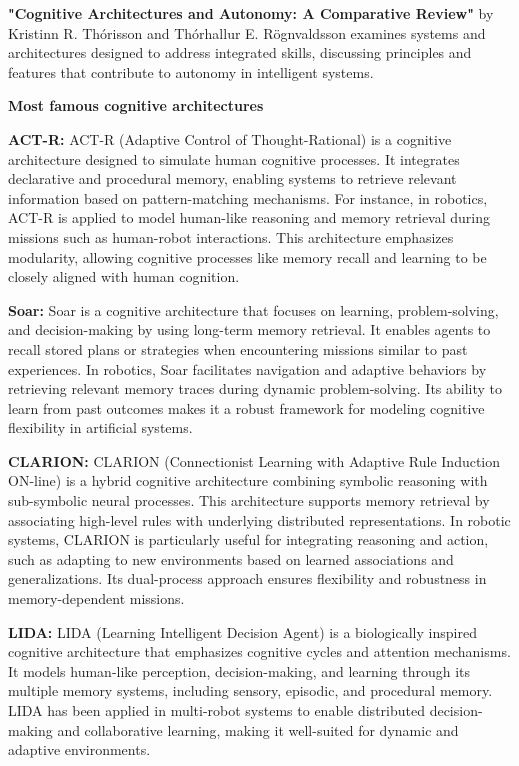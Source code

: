 \documentclass{book}
\providecommand{\ProjectDeepHeading}[2]{%
    \par\medskip\noindent\textbf{#2}\par\smallskip
}
\begin{document}
            \textbf{"Cognitive Architectures and Autonomy: A Comparative Review"} by Kristinn R. Thórisson and Thórhallur E. Rögnvaldsson examines systems and architectures designed to address integrated skills, discussing principles and features that contribute to autonomy in intelligent systems. 



        \ProjectDeepHeading{2}{Most famous cognitive architectures}
            \textbf{ACT-R:} ACT-R (Adaptive Control of Thought-Rational) is a cognitive architecture designed to simulate human cognitive processes. It integrates declarative and procedural memory, enabling systems to retrieve relevant information based on pattern-matching mechanisms. For instance, in robotics, ACT-R is applied to model human-like reasoning and memory retrieval during missions such as human-robot interactions. This architecture emphasizes modularity, allowing cognitive processes like memory recall and learning to be closely aligned with human cognition.

            \textbf{Soar:} Soar is a cognitive architecture that focuses on learning, problem-solving, and decision-making by using long-term memory retrieval. It enables agents to recall stored plans or strategies when encountering missions similar to past experiences. In robotics, Soar facilitates navigation and adaptive behaviors by retrieving relevant memory traces during dynamic problem-solving. Its ability to learn from past outcomes makes it a robust framework for modeling cognitive flexibility in artificial systems.

            \textbf{CLARION:} CLARION (Connectionist Learning with Adaptive Rule Induction ON-line) is a hybrid cognitive architecture combining symbolic reasoning with sub-symbolic neural processes. This architecture supports memory retrieval by associating high-level rules with underlying distributed representations. In robotic systems, CLARION is particularly useful for integrating reasoning and action, such as adapting to new environments based on learned associations and generalizations. Its dual-process approach ensures flexibility and robustness in memory-dependent missions.

            \textbf{LIDA:} LIDA (Learning Intelligent Decision Agent) is a biologically inspired cognitive architecture that emphasizes cognitive cycles and attention mechanisms. It models human-like perception, decision-making, and learning through its multiple memory systems, including sensory, episodic, and procedural memory. LIDA has been applied in multi-robot systems to enable distributed decision-making and collaborative learning, making it well-suited for dynamic and adaptive environments. 
\end{document}
